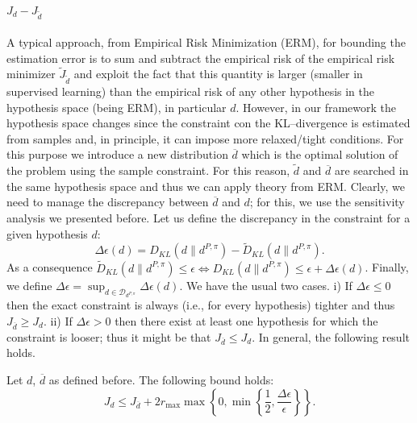 \paragraph{$J_d - J_{\widetilde{d}}$}
A typical approach, from Empirical Risk Minimization (ERM), for bounding the estimation error is to sum and subtract the empirical risk of the empirical risk minimizer $\widetilde{J}_{\widetilde{d}}$ and exploit the fact that this quantity is larger (smaller in supervised learning) than the empirical risk of any other hypothesis in the hypothesis space (being ERM), in particular $d$. However, in our framework the hypothesis space changes since the constraint con the KL--divergence is estimated from samples and, in principle, it can impose more relaxed/tight conditions. For this purpose we introduce a new distribution $\overline{d}$ which is the optimal solution of the \opt{\epsilon} problem using the sample constraint. For this reason, $\widetilde{d}$ and $\overline{d}$ are searched in the same hypothesis space and thus we can apply theory from ERM. Clearly, we need to manage the discrepancy between $\overline{d}$ and $d$; for this, we use the sensitivity analysis we presented before. Let us define the discrepancy in the constraint for a given hypothesis $d$:
\begin{equation}
	\Delta \epsilon(d) = D_{KL}(d\|d^{P,\pi}) - {\widetilde{D}}_{KL}(d\|d^{P,\pi}).
\end{equation}
As a consequence ${\widetilde{D}}_{KL}(d\|d^{P,\pi}) \le \epsilon  \iff  D_{KL}(d\|d^{P,\pi}) \le \epsilon + \Delta \epsilon(d)$. Finally, we define $\Delta \epsilon = \sup_{d \in \mathcal{D}_{d^{P,\pi}}} \Delta \epsilon(d)$.
We have the usual two cases. i) If $\Delta \epsilon \le 0$ then the exact constraint is always (i.e., for every hypothesis) tighter and thus $J_{\overline{d}} \ge J_d$. ii) If $\Delta \epsilon > 0$ then there exist at least one hypothesis for which the constraint is looser; thus it might be that $J_{\overline{d}} \le J_d$. In general, the following result holds.
\begin{lemma}
	Let $d$, $\overline{d}$ as defined before. The following bound holds:
	\begin{equation}
		J_d  \le J_{\overline{d}} + 2 r_{\max} \max \left\{0, \min\left\{\frac{1}{2}, \frac{\Delta \epsilon}{\epsilon} \right\} \right\}.
	\end{equation}
\end{lemma}

